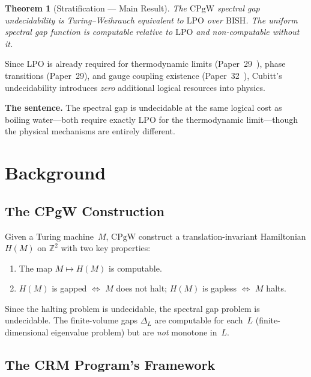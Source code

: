 \documentclass[11pt,a4paper]{article}
\theoremstyle{plain}
\newtheorem{theorem}{Theorem}[section]
\theoremstyle{definition}
\newcommand{\ZZ}{\mathbb{Z}}
\newcommand{\LPO}{\ensuremath{\mathrm{LPO}}}
\newcommand{\BISH}{\ensuremath{\mathrm{BISH}}}
\newcommand{\CPgW}{\ensuremath{\mathrm{CPgW}}}
\begin{document}
\begin{theorem}[Stratification --- Main Result]\label{thm:main}
The $\CPgW$ spectral gap undecidability is Turing--Weihrauch
equivalent to $\LPO$ over $\BISH$. The uniform spectral gap
function is computable relative to $\LPO$ and non-computable
without it.
\end{theorem}

Since $\LPO$ is already required for thermodynamic limits
(Paper~29~\cite{Lee26P29}), phase transitions (Paper~29),
and gauge coupling existence (Paper~32~\cite{Lee26P32}),
Cubitt's undecidability introduces
\emph{zero} additional logical resources into physics.

\medskip\noindent
\textbf{The sentence.} The spectral gap is undecidable at the same
logical cost as boiling water---both require exactly $\LPO$ for the
thermodynamic limit---though the physical mechanisms are entirely
different.

\section{Background}\label{sec:background}

\subsection{The CPgW Construction}

Given a Turing machine~$M$, $\CPgW$ construct a translation-invariant
Hamiltonian $H(M)$ on $\ZZ^2$ with two key properties:

\begin{enumerate}[label=(\CPgW-\arabic*)]
  \item The map $M \mapsto H(M)$ is computable.
  \item $H(M)$ is gapped $\iff$ $M$ does not halt;
        $H(M)$ is gapless $\iff$ $M$ halts.
\end{enumerate}

Since the halting problem is undecidable, the spectral gap problem
is undecidable. The finite-volume gaps $\Delta_L$ are computable
for each~$L$ (finite-dimensional eigenvalue problem) but are
\emph{not} monotone in~$L$.

\subsection{The CRM Program's Framework}
\end{document}
